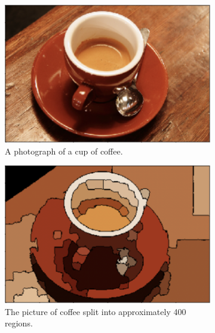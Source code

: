 \begin{figure}[h!]
    \centering
    \begin{subfigure}[t]{0.29\textwidth}
        \centering
        \captionsetup{justification=centering}
        \includegraphics[scale=0.25]{figures/adjacencyBefore}
        \caption{A photograph of a cup of coffee.}
    \end{subfigure} \hfill%
    \begin{subfigure}[t]{0.29\textwidth}
        \centering
        \captionsetup{justification=centering}
        \includegraphics[scale=0.25]{figures/adjacencyMiddle}
        \caption{The picture of coffee split into approximately 400 regions.}
    \end{subfigure} \hfill%
    \begin{subfigure}[t]{0.29\textwidth}
        \centering
        \captionsetup{justification=centering}

\end{subfigure}
\end{figure}
